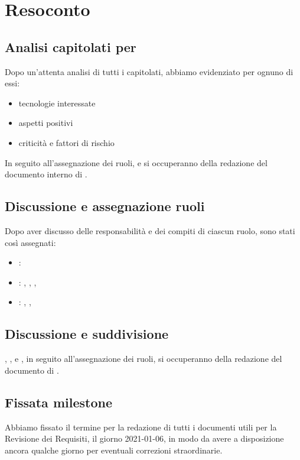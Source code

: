 \section{Resoconto}

\subsection{Analisi capitolati per \SdF{}}
Dopo un'attenta analisi di tutti i capitolati, abbiamo evidenziato per ognuno di essi:
	\begin{itemize}
		\item tecnologie interessate
		\item aspetti positivi
		\item criticità e fattori di rischio
	\end{itemize}
In seguito all'assegnazione dei ruoli, \GB{} e \MDI{} si occuperanno della redazione del documento interno di \SdF{}.

\subsection{Discussione e assegnazione ruoli}
Dopo aver discusso delle responsabilità e dei compiti di ciascun ruolo, sono stati così assegnati:
	\begin{itemize}
		\item \respProg : \MB
		\item \ammProg : \SB , \FD , \NM , \VAS
		\item \analProg : \GB , \MDI , \MB
	\end{itemize}

\subsection{Discussione e suddivisione \NdP}
\SB , \FD , \NM{} e \VAS{}, in seguito all'assegnazione dei ruoli, si occuperanno della redazione del documento di \NdP{} .

\subsection{Fissata milestone}
Abbiamo fissato il termine per la redazione di tutti i documenti utili per la Revisione dei Requisiti, il giorno 2021-01-06, in modo da avere a disposizione ancora qualche giorno per eventuali correzioni straordinarie.